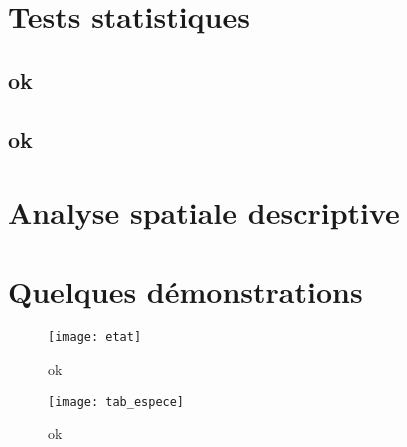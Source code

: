 \documentclass[a4paper, oneside, 12pt]{book}
\begin{document}
\begin{appendix}
\chapter{Tests statistiques}
\label{Tests statistiques}
\section*{ok}
\section*{ok}
\chapter{Analyse spatiale descriptive}
\label{Analyse spatiale descriptive}




\chapter{Quelques démonstrations}
\label{whatever}
\begin{figure}[H]
	\centering
	\caption{ok}
	\texttt{[image: etat]}
\end{figure}
\begin{figure}[H]
	\centering
	\caption{ok}
	\texttt{[image: tab\_espece]}
\end{figure}








\end{appendix}


\tableofcontents
\end{document}
